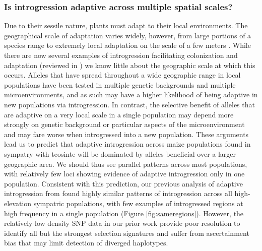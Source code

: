 \subsubsection{Is introgression adaptive across multiple spatial scales?}
\label{sss:scale}

Due to their sessile nature, plants must adapt to their local environments. 
The geographical scale of adaptation varies widely, however, from large portions of a species range \citep{lowry2010, fang2014} to extremely local adaptation on the scale of a few meters \citep{hamrick1979}.  
While there are now several examples of introgression facilitating colonization and adaptation (reviewed in \citealt{Bock2015}) we know little about the geographic scale at which this occurs.
Alleles that have spread throughout a wide geographic range in local populations have been tested in multiple genetic backgrounds and multiple microenvironments, and as such may have a higher likelihood of being adaptive in new populations via introgression.
In contrast, the selective benefit of alleles that are adaptive on a very local scale in a single population may depend more strongly on genetic background or particular aspects of the microenvironment and may fare worse when introgressed into a new population. 
These arguments lead us to predict that adaptive introgression across maize populations found in sympatry with teosinte will be dominated by alleles beneficial over a larger geographic area.
We should thus see parallel patterns across most populations, with relatively few loci showing evidence of adaptive introgression only in one population.
Consistent with this prediction, our previous analysis of adaptive introgression from \zm{} found highly similar patterns of introgression across all high-elevation sympatric populations, with few examples of introgressed regions at high frequency in a single population (Figure \ref{fig:sameregions}).
However, the relatively low density SNP data in our prior work provide poor resolution to identify all but the strongest selection signatures \citep{tiffin2014advances} and suffer from ascertainment bias that may limit detection of diverged haplotypes. 
  
